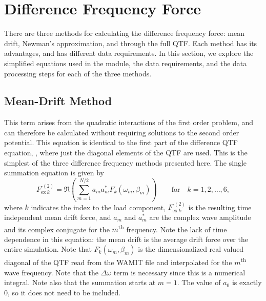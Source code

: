 \section{Difference Frequency Force}
\label{sec:2ndOrdCalc:Diff}

There are three methods for calculating the difference frequency force: mean drift, Newman's approximation, and through the full QTF.  Each method has its advantages, and has different data requirements.  In this section, we explore the simplified equations used in the  module, the data requirements, and the data processing steps for each of the three methods.



\subsection{Mean-Drift Method}
\label{sec:2ndOrdCalc:Diff:MeanDrift}
This term arises from the quadratic interactions of the first order problem, and can therefore be calculated without requiring solutions to the second order potential.  This equation is identical to the first part of the difference QTF equation, , where just the diagonal elements of the QTF are used.  This is the simplest of the three difference frequency methods presented here. The single summation equation is given by 
\begin{equation}
   {F_{\text{ex}~k}^{\text{-}(2)}} =
            \Re \left( \sum\limits_{m=1}^{N/2}
                  {a_m} {a_m^*} F_k^\text{-}(\omega_m, \beta_m)\right) \qquad
      \text{for}\quad k=1,2,\ldots,6,
\label{eq:MeanDrift}
\end{equation}
where $k$ indicates the index to the load component,  ${F_{\text{ex}~k}^{\text{-}(2)}}$ is the resulting time independent mean drift force, and $a_m$ and $a_m^*$ are the complex wave amplitude and its complex conjugate for the $m$\textsuperscript{th} frequency.  Note the lack of time dependence in this equation: the mean drift is the average drift force over the entire simulation.
Note that $F_k^\text{-} (\omega_m, \beta_m)$ is the dimensionalized real valued diagonal of the QTF read from the WAMIT file and interpolated for the $m$\textsuperscript{th} wave frequency.  Note that the $\Delta\omega$ term is necessary since this is a numerical integral.
Note also that the summation starts at $m=1$.  The value of $a_0$ is exactly 0, so it does not need to be included.


